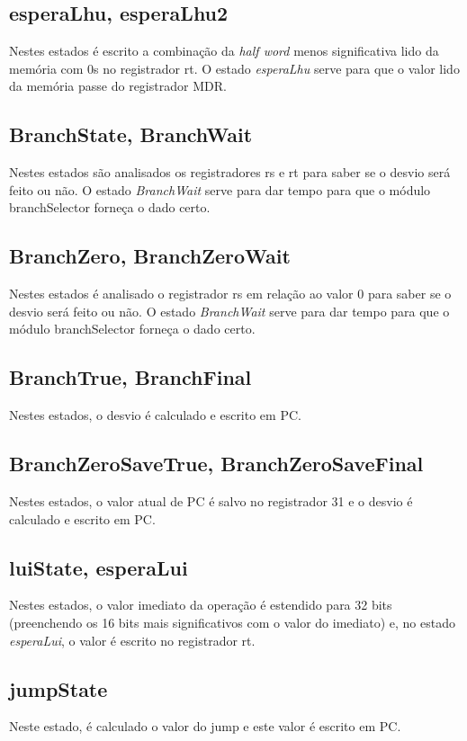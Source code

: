 \documentclass{article}
\begin{document}
    \subsection{esperaLhu, esperaLhu2}
    Nestes estados é escrito a combinação da {\it half word} menos significativa lido da memória com 0s no registrador rt. O estado {\it esperaLhu} serve para que o valor lido da memória passe do registrador MDR.
    
    \subsection{BranchState, BranchWait}
    Nestes estados são analisados os registradores rs e rt para saber se o desvio será feito ou não. O estado {\it BranchWait} serve para dar tempo para que o módulo branchSelector forneça o dado certo.
    
    \subsection{BranchZero, BranchZeroWait}
    Nestes estados é analisado o registrador rs em relação ao valor 0 para saber se o desvio será feito ou não. O estado {\it BranchWait} serve para dar tempo para que o módulo branchSelector forneça o dado certo.
    
    \subsection{BranchTrue, BranchFinal}
    Nestes estados, o desvio é calculado e escrito em PC.
    
    \subsection{BranchZeroSaveTrue, BranchZeroSaveFinal}
    Nestes estados, o valor atual de PC é salvo no registrador 31 e o desvio é calculado e escrito em PC.
    
    \subsection{luiState, esperaLui}
    Nestes estados, o valor imediato da operação é estendido para 32 bits (preenchendo os 16 bits mais significativos com o valor do imediato) e, no estado {\it esperaLui}, o valor é escrito no registrador rt.
    
    \subsection{jumpState}
    Neste estado, é calculado o valor do jump e este valor é escrito em PC.
    
\end{document}
